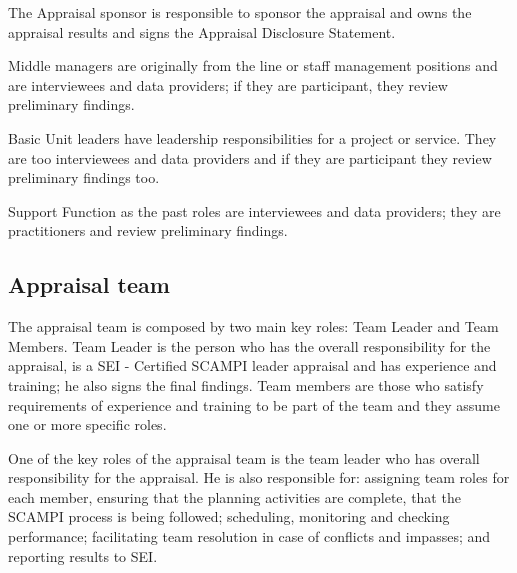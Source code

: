 The Appraisal sponsor is responsible to sponsor the appraisal and owns the appraisal results and signs the Appraisal Disclosure Statement.

Middle managers are originally from the line or staff management positions and are interviewees and data providers; if they are participant, they review preliminary findings.

Basic Unit leaders have leadership responsibilities for a project or service. They are too interviewees and data providers and if they are participant they review preliminary findings too.

Support Function as the past roles are interviewees and data providers; they are practitioners and review preliminary findings.

\subsection{Appraisal team}

The appraisal team is composed by two main key roles: Team Leader and Team Members.
Team Leader is the person who has the overall responsibility for the appraisal, is a SEI - Certified SCAMPI \citep{SCAMPITeam2013} leader appraisal and has experience and training; he also signs the final findings.
Team members are those who satisfy requirements of  experience and training to be part of the team and they assume one or more specific roles.

One of the key roles of the appraisal team is the team leader who has overall responsibility for the appraisal. He is also responsible for: assigning team roles for each member, ensuring that the planning activities are complete, that the SCAMPI process is being followed; scheduling, monitoring and checking performance; facilitating team resolution in case of conflicts and impasses; and reporting results to SEI.

